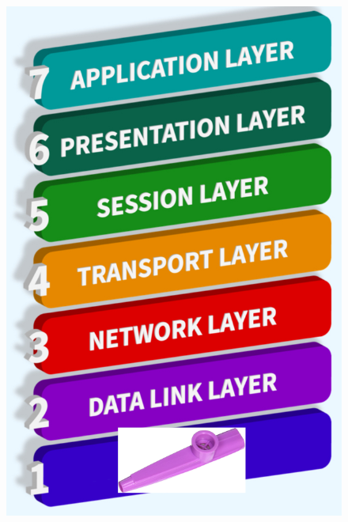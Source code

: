 \documentclass[
	11pt, %
]{beamer}
\begin{document}
\begin{frame}
\begin{columns}[c]
\begin{column}{0.25\textwidth}
\begin{center}
\begin{figure}
          \includegraphics[width=1\linewidth]{new_osi_model.png}
        \end{figure}
      \end{center}
    \end{column}
  \end{columns}

\end{frame}

\end{document}
